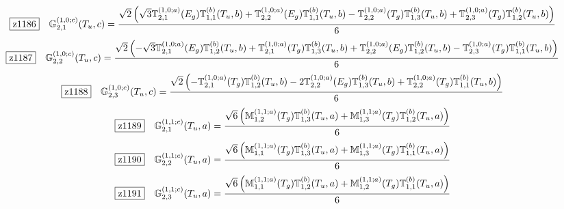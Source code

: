 \documentclass[fleqn,10pt,landscape]{jsarticle}
\begin{document}
\begin{dmath*}
\hspace*{3mm}\fbox{z1186}\quad \mathbb{G}_{2,1}^{(1,0;c)}(T_{u},c)=\frac{\sqrt{2} \left(\sqrt{3} \mathbb{T}_{2,1}^{(1,0;a)}(E_{g}) \mathbb{T}_{1,1}^{(b)}(T_{u},b) + \mathbb{T}_{2,2}^{(1,0;a)}(E_{g}) \mathbb{T}_{1,1}^{(b)}(T_{u},b) - \mathbb{T}_{2,2}^{(1,0;a)}(T_{g}) \mathbb{T}_{1,3}^{(b)}(T_{u},b) + \mathbb{T}_{2,3}^{(1,0;a)}(T_{g}) \mathbb{T}_{1,2}^{(b)}(T_{u},b)\right)}{6}
\end{dmath*}
\begin{dmath*}
\hspace*{3mm}\fbox{z1187}\quad \mathbb{G}_{2,2}^{(1,0;c)}(T_{u},c)=\frac{\sqrt{2} \left(- \sqrt{3} \mathbb{T}_{2,1}^{(1,0;a)}(E_{g}) \mathbb{T}_{1,2}^{(b)}(T_{u},b) + \mathbb{T}_{2,1}^{(1,0;a)}(T_{g}) \mathbb{T}_{1,3}^{(b)}(T_{u},b) + \mathbb{T}_{2,2}^{(1,0;a)}(E_{g}) \mathbb{T}_{1,2}^{(b)}(T_{u},b) - \mathbb{T}_{2,3}^{(1,0;a)}(T_{g}) \mathbb{T}_{1,1}^{(b)}(T_{u},b)\right)}{6}
\end{dmath*}
\begin{dmath*}
\hspace*{3mm}\fbox{z1188}\quad \mathbb{G}_{2,3}^{(1,0;c)}(T_{u},c)=\frac{\sqrt{2} \left(- \mathbb{T}_{2,1}^{(1,0;a)}(T_{g}) \mathbb{T}_{1,2}^{(b)}(T_{u},b) - 2 \mathbb{T}_{2,2}^{(1,0;a)}(E_{g}) \mathbb{T}_{1,3}^{(b)}(T_{u},b) + \mathbb{T}_{2,2}^{(1,0;a)}(T_{g}) \mathbb{T}_{1,1}^{(b)}(T_{u},b)\right)}{6}
\end{dmath*}
\begin{dmath*}
\hspace*{3mm}\fbox{z1189}\quad \mathbb{G}_{2,1}^{(1,1;c)}(T_{u},a)=\frac{\sqrt{6} \left(\mathbb{M}_{1,2}^{(1,1;a)}(T_{g}) \mathbb{T}_{1,3}^{(b)}(T_{u},a) + \mathbb{M}_{1,3}^{(1,1;a)}(T_{g}) \mathbb{T}_{1,2}^{(b)}(T_{u},a)\right)}{6}
\end{dmath*}
\begin{dmath*}
\hspace*{3mm}\fbox{z1190}\quad \mathbb{G}_{2,2}^{(1,1;c)}(T_{u},a)=\frac{\sqrt{6} \left(\mathbb{M}_{1,1}^{(1,1;a)}(T_{g}) \mathbb{T}_{1,3}^{(b)}(T_{u},a) + \mathbb{M}_{1,3}^{(1,1;a)}(T_{g}) \mathbb{T}_{1,1}^{(b)}(T_{u},a)\right)}{6}
\end{dmath*}
\begin{dmath*}
\hspace*{3mm}\fbox{z1191}\quad \mathbb{G}_{2,3}^{(1,1;c)}(T_{u},a)=\frac{\sqrt{6} \left(\mathbb{M}_{1,1}^{(1,1;a)}(T_{g}) \mathbb{T}_{1,2}^{(b)}(T_{u},a) + \mathbb{M}_{1,2}^{(1,1;a)}(T_{g}) \mathbb{T}_{1,1}^{(b)}(T_{u},a)\right)}{6}
\end{dmath*}
\end{document}
